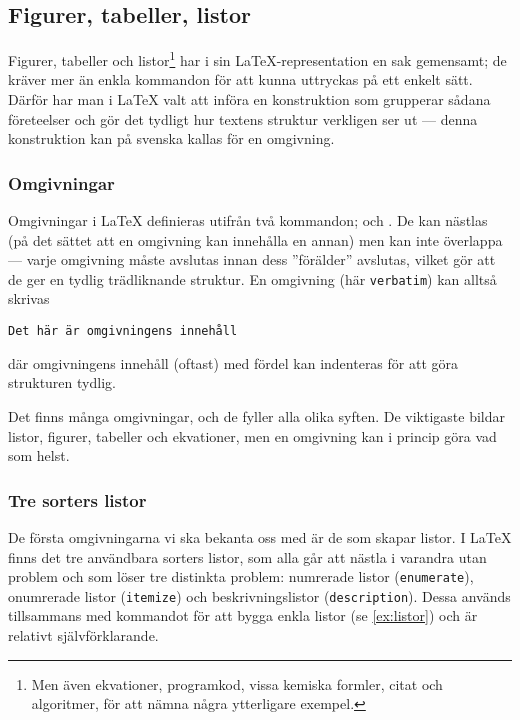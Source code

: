 \documentclass[lang=sv,ptsize=10pt,font=none,nomath,titles=bf,../../a4.tex]{subfiles}
\begin{document}
\subsection{Figurer, tabeller, listor}
Figurer, tabeller och listor\footnote{Men även ekvationer, programkod,
vissa kemiska formler, citat och algoritmer, för att nämna några
ytterligare exempel.} har i sin \LaTeX-representation en sak gemensamt;
de kräver mer än enkla kommandon för att kunna uttryckas på ett enkelt
sätt. Därför har man i \LaTeX{} valt att införa en konstruktion som
grupperar sådana företeelser och gör det tydligt hur textens struktur
verkligen ser ut — denna konstruktion kan på svenska kallas för en 
omgivning.

\subsubsection{Omgivningar }\label{sec:omg}
Omgivningar i \LaTeX{} definieras utifrån två kommandon;  och
. De kan nästlas (på det sättet att en omgivning kan innehålla
en annan) men kan inte överlappa — varje omgivning måste avslutas innan
dess ”förälder” avslutas, vilket gör att de ger en tydlig trädliknande
struktur. En omgivning (här \texttt{verbatim}) kan alltså skrivas
\begin{latexcode}
\begin{verbatim}
Det här är omgivningens innehåll
\end{verbatim}
\end{latexcode}
där omgivningens innehåll (oftast) med fördel kan indenteras för att göra
strukturen tydlig.

Det finns många omgivningar, och de fyller alla olika syften. De
viktigaste bildar listor, figurer, tabeller och ekvationer, men en
omgivning kan i princip göra vad som helst.

\subsubsection{Tre sorters listor}
De första omgivningarna vi ska bekanta oss med är de som skapar listor.
I \LaTeX{} finns det tre användbara sorters listor, som alla går att
nästla i varandra utan problem och som löser tre distinkta problem:
numrerade listor (\texttt{enumerate}), onumrerade listor 
(\texttt{itemize}) och beskrivningslistor (\texttt{description}). Dessa
används tillsammans med kommandot  för att bygga enkla listor
(se \cref{ex:listor}) och är relativt självförklarande.
\end{document}
